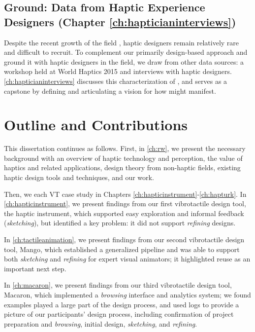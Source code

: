 \subsection{Ground: Data from Haptic Experience Designers (Chapter \ref{ch:hapticianinterviews})}
Despite the recent growth of the field , haptic designers remain relatively rare and difficult to recruit.
To complement our primarily design-based approach and ground it with haptic designers in the field, we draw from other data sources: a workshop held at World Haptics 2015 and interviews with haptic designers.
\autoref{ch:hapticianinterviews} discusses this characterization of \haxd, and serves as a capstone  by defining \haxd and articulating a vision for how \haxd might manifest.




\section{Outline and Contributions}
This dissertation continues as follows.
First, in \autoref{ch:rw}, we present the necessary background with an overview of haptic technology and perception, the value of haptics and related applications,  design theory from non-haptic fields,  existing haptic design tools and techniques, and  our work.

Then, we  %
each VT case study in Chapters \ref{ch:hapticinstrument}-\ref{ch:hapturk}.
In \autoref{ch:hapticinstrument}, we present findings from our first vibrotactile design tool, the haptic instrument, which supported easy exploration and informal feedback (\emph{sketching}), but identified a key problem: it did not support \emph{refining} designs.

In \autoref{ch:tactileanimation}, we present findings from our second vibrotactile design tool, Mango, which established a generalized pipeline and was able to support both \emph{sketching} and \emph{refining} for expert visual animators; it highlighted reuse as an important next step.

In \autoref{ch:macaron}, we present findings from our third vibrotactile design tool, Macaron, which implemented a \emph{browsing} interface and analytics system; we found examples played a large part of the design process, and used  %
logs to provide a picture of our participants' design process, including confirmation of project preparation and \emph{browsing}, initial design, \emph{sketching}, and \emph{refining}.

